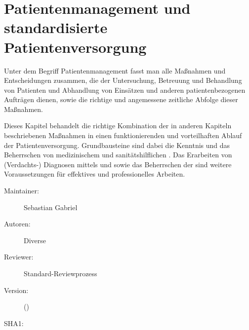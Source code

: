 \def\ChapterCode{PAM}
	\chapter
[\CO{[PAM]} Patientenmanagement und standardisierte Patientenversorgung]
{Patientenmanagement und standardisierte Patientenversorgung}
\label{chp:PAM}

\ChapterIntro
{%
Unter dem Begriff Patientenmanagement fasst man alle
Maßnahmen und Entscheidungen zusammen, die der Untersuchung,
Betreuung und Behandlung von Patienten und Abhandlung von
Einsätzen und anderen patientenbezogenen Aufträgen dienen,
sowie die richtige und angemessene zeitliche Abfolge dieser
Maßnahmen.

Dieses Kapitel behandelt die richtige Kombination der in
anderen Kapiteln beschriebenen Maßnahmen in einen
funktionierenden und vorteilhaften Ablauf der
Patientenversorgung. Grundbausteine sind dabei die Kenntnis
und das Beherrschen von medizinischem  und
sanitätshilflichen . Das Erarbeiten von
(Verdachts-) Diagnosen mittels  und
 sowie das Beherrschen der
 sind weitere
Voraussetzungen für effektives und professionelles Arbeiten.
}
{%
\begin{description}
  \item[Maintainer:] Sebastian Gabriel
  \item[Autoren:] Diverse
  \item[Reviewer:] Standard-Reviewprozess
  \item[Version:] {\VarDocVersionTypeName} ({\VarDocVersionTypeDescription})
  \item[SHA1:] {\DocGitCommit}
\end{description}

{\TxTeilkapitelAASS}}







\clearpage %



